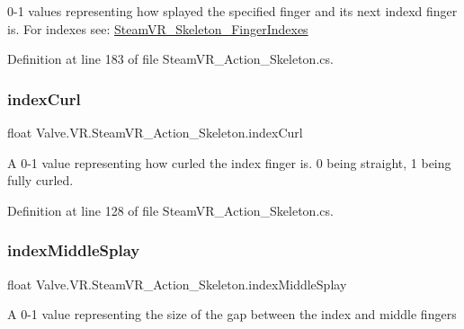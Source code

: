 0-\/1 values representing how splayed the specified finger and it\textquotesingle{}s next index\textquotesingle{}d finger is. For indexes see\+: \mbox{\hyperlink{class_valve_1_1_v_r_1_1_steam_v_r___skeleton___finger_indexes}{Steam\+V\+R\+\_\+\+Skeleton\+\_\+\+Finger\+Indexes}} 



Definition at line 183 of file Steam\+V\+R\+\_\+\+Action\+\_\+\+Skeleton.\+cs.

\mbox{\label{class_valve_1_1_v_r_1_1_steam_v_r___action___skeleton_af2e4283e738877f71330b48a34fdd482}} 
\subsubsection{\texorpdfstring{indexCurl}{indexCurl}}
{\footnotesize\ttfamily float Valve.\+V\+R.\+Steam\+V\+R\+\_\+\+Action\+\_\+\+Skeleton.\+index\+Curl\hspace{0.3cm}{\ttfamily [get]}}



A 0-\/1 value representing how curled the index finger is. 0 being straight, 1 being fully curled. 



Definition at line 128 of file Steam\+V\+R\+\_\+\+Action\+\_\+\+Skeleton.\+cs.

\mbox{\label{class_valve_1_1_v_r_1_1_steam_v_r___action___skeleton_a5fa7a1cda4ef19c596a08702ea2a0171}} 
\subsubsection{\texorpdfstring{indexMiddleSplay}{indexMiddleSplay}}
{\footnotesize\ttfamily float Valve.\+V\+R.\+Steam\+V\+R\+\_\+\+Action\+\_\+\+Skeleton.\+index\+Middle\+Splay\hspace{0.3cm}{\ttfamily [get]}}



A 0-\/1 value representing the size of the gap between the index and middle fingers 



